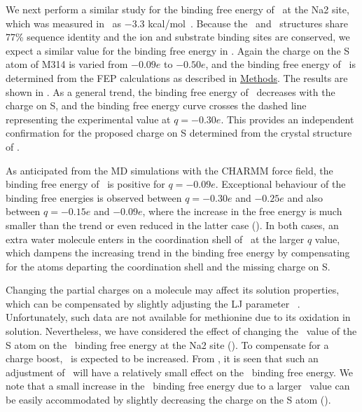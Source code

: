 We next perform a similar study for the binding free energy of \Na\ at the Na2 site, which was 
measured in \GltPh\ as $-3.3$ kcal/mol~\cite{Ryan2009}. Because the \GltPh\ and \GltTk\ structures 
share 77\% sequence identity and the ion and substrate binding sites are conserved, we expect a 
similar value for the binding free energy in \GltTk. Again the charge on the S atom of M314 is 
varied from $-0.09e$ to $-0.50e$, and the binding free energy of \Na\ is determined from the FEP 
calculations as described in \hyperref[na2:theory]{Methods}. The results are shown in 
. As a general trend, the binding free energy of \Na\ decreases with the charge 
on S, and the binding free energy curve crosses the dashed line representing the experimental value 
at $q = -0.30e$. This provides an independent confirmation for the proposed charge on S determined 
from the crystal structure of \GltTk.

As anticipated from the MD simulations with the CHARMM force field, the binding free energy of \Na\ 
is positive for $q = -0.09e$. Exceptional behaviour of the binding free energies is observed between 
$q = -0.30e$ and $-0.25e$ and also between $q = -0.15e$ and $-0.09e$, where the increase in the free 
energy is much smaller than the trend or even reduced in the latter case (\figrefi{na2:fig3}{A}). In 
both cases, an extra water molecule enters in the coordination shell of \Na\ at the larger $q$ value, 
which dampens the increasing trend in the binding free energy by compensating for the atoms departing 
the coordination shell and the missing charge on S. 

Changing the partial charges on a molecule may affect its solution properties, which can be 
compensated by slightly adjusting the LJ parameter \Rmin~\cite{Luo2010a}. Unfortunately, such data 
are not available for methionine due to its oxidation in solution. Nevertheless, we have considered 
the effect of changing the \Rmin\ value of the S atom on the \Na\ binding free energy at the Na2 
site (). To compensate for a charge boost, \Rmin\ is expected to be increased. 
From \figrefi{na2:fig3}{B}, it is seen that such an adjustment of \Rmin\ will have a relatively small 
effect on the \Na\ binding free energy. We note that a small increase in the \Na\ binding free energy 
due to a larger \Rmin\ value can be easily accommodated by slightly decreasing the charge on the S 
atom (\figrefi{na2:fig3}{A}). 

